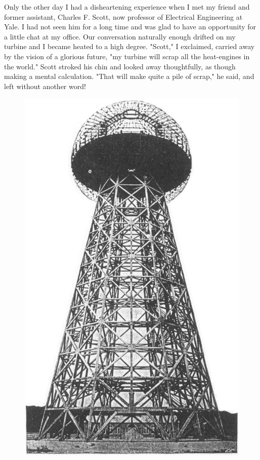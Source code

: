 \documentclass[a4paper,12pt,english,twoside,openright]{memoir}
\begin{document}
Only the other day I had a disheartening experience when I met my friend and former assistant, 
Charles F. Scott, now professor of Electrical Engineering at Yale.  I had not seen him for a long 
time and was glad to have an opportunity for a little chat at my office.  Our conversation naturally 
enough drifted on my turbine and I became heated to a high degree.  "Scott," I exclaimed, carried 
away by the vision of a glorious future, "my turbine will scrap all the heat-engines in the world." 
Scott stroked his chin and looked away thoughtfully, as though making a mental calculation.  
"That will make quite a pile of scrap," he said, and left without another word! 
\begin{figure}[p]
	\begin{center}
		\includegraphics[height=.75\textheight]{Tower.png}

\end{center}
\end{figure}
\end{document}
